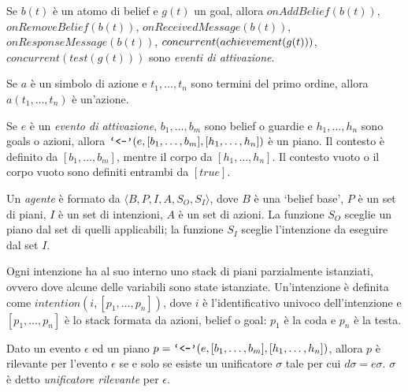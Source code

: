 \smallskip
\begin{defn}\label{defn:triggeringEvents}
Se $b(t)$ è un atomo di belief e $g(t)$ un goal, allora $onAddBelief(b(t))$, $onRemoveBelief(b(t))$, $onReceivedMessage(b(t))$, $onResponseMessage(b(t))$,  $con\-cur\-rent(achieve\-ment(g(t)))$, $concurrent(test(g(t)))$ sono \textit{eventi di attivazione}.
\end{defn}

\smallskip
\begin{defn}
Se $a$ è un simbolo di azione e $t_1, \ldots, t_n$ sono termini del primo ordine, allora $a(t_1, \ldots, t_n)$ è un'azione.
\end{defn}

\smallskip
\begin{defn}
Se $e$ è un \textit{evento di attivazione}, $b_1, \ldots, b_m$ sono belief o guardie e $h_1, \ldots, h_n$ sono goals o azioni, allora $\text{\text{\texttt{`<-'}}}(e, [b_1, \ldots, b_m], [h_1, \ldots, h_n])$ è un piano.
Il contesto è definito da $[b_1, \ldots, b_m]$, mentre il corpo da $[h_1, \ldots, h_n]$. Il contesto vuoto o il corpo vuoto sono definiti entrambi da $[true]$.
\end{defn}

\smallskip
\begin{defn}
Un \textit{agente} è formato da $\langle B,P,I,A,S_O,S_I \rangle$, dove $B$ è una `belief base', $P$ è un set di piani, $I$ è un set di intenzioni, $A$ è un set di azioni. La funzione $S_O$ sceglie un piano dal set di quelli applicabili; la funzione $S_I$ sceglie l'intenzione da eseguire dal set $I$.
\end{defn}

\smallskip
\begin{defn}\label{defn:intenzione}
Ogni intenzione ha al suo interno uno stack di piani parzialmente istanziati, ovvero dove alcune delle variabili sono state istanziate. Un'intenzione è definita come $intention(i, [p_1, \ldots, p_n])$, dove $i$ è l'identificativo univoco dell'intenzione e $[p_1, \ldots,p_n]$ è lo stack formata da azioni, belief o goal: $p_1$ è la coda e $p_n$ è la testa.
\end{defn}

\smallskip
\begin{defn}
Dato un evento $\epsilon$ ed un piano $p = \text{\text{\texttt{`<-'}}}(e, [b_1, \ldots, b_m], [h_1, \ldots, h_n])$, allora $p$ è rilevante per l'evento $\epsilon$ se e solo se esiste un unificatore $\sigma$ tale per cui $d\sigma = e\sigma$. $\sigma$ è detto \textit{unificatore rilevante} per $\epsilon$.
\end{defn}

